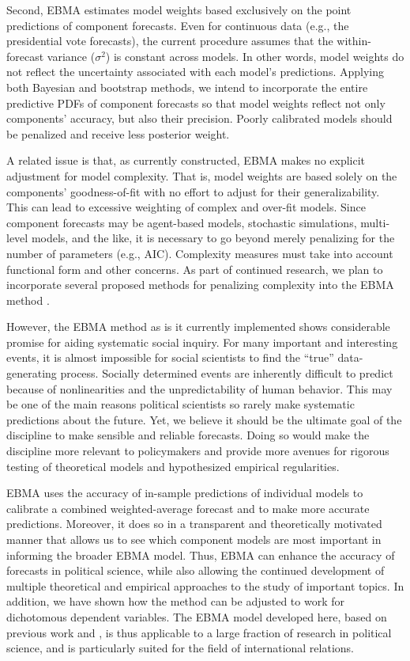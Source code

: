 \documentclass[12pt,fullpage]{article}
\begin{document}
Second, EBMA estimates model weights based exclusively on the point
predictions of component forecasts.  Even for continuous data (e.g.,
the presidential vote forecasts), the current procedure assumes that
the within-forecast variance ($\sigma^2$) is constant across models.
In other words, model weights do not reflect the uncertainty
associated with each model's predictions.  Applying both Bayesian and
bootstrap methods, we intend to incorporate the entire predictive PDFs
of component forecasts so that model weights reflect not only
components' accuracy, but also their precision.  Poorly calibrated
models should be penalized and receive less posterior weight.

A related issue is that, as currently constructed, EBMA makes no
explicit adjustment for model complexity. That is, model weights are
based solely on the components’ goodness-of-fit with no effort to
adjust for their generalizability. This can lead to excessive
weighting of complex and over-fit models. Since component forecasts
may be agent-based models, stochastic simulations, multi-level models,
and the like, it is necessary to go beyond merely penalizing for the
number of parameters (e.g., AIC). Complexity measures must take into
account functional form and other concerns. As part of continued
research, we plan to incorporate several proposed methods for
penalizing complexity into the EBMA method \citep[c.f.,][]{Pitt:2002a,
  Pitt:2002b, Spiegelhalter:2002}.

However, the EBMA method as is it currently implemented shows
considerable promise for aiding systematic social inquiry.  For many
important and interesting events, it is almost impossible for social
scientists to find the ``true'' data-generating process.  Socially
determined events are inherently difficult to predict because of
nonlinearities and the unpredictability of human behavior.  This may
be one of the main reasons political scientists so rarely make
systematic predictions about the future. Yet, we believe it should be
the ultimate goal of the discipline to make sensible and reliable
forecasts.  Doing so would make the discipline more relevant to
policymakers and provide more avenues for rigorous testing of
theoretical models and hypothesized empirical regularities.

EBMA uses the accuracy of in-sample predictions of individual models
to calibrate a combined weighted-average forecast and to make more
accurate predictions.  Moreover, it does so in a transparent and
theoretically motivated manner that allows us to see which component
models are most important in informing the broader EBMA model.  Thus,
EBMA can enhance the accuracy of forecasts in political science, while
also allowing the continued development of multiple theoretical and
empirical approaches to the study of important topics. In addition, we
have shown how the method can be adjusted to work for dichotomous
dependent variables.  The EBMA model developed here, based on previous
work \citet{Sloughter:2007} and \citet{Sloughter:2010}, is thus
applicable to a large fraction of research in political science, and
is particularly suited for the field of international relations.
\end{document}
